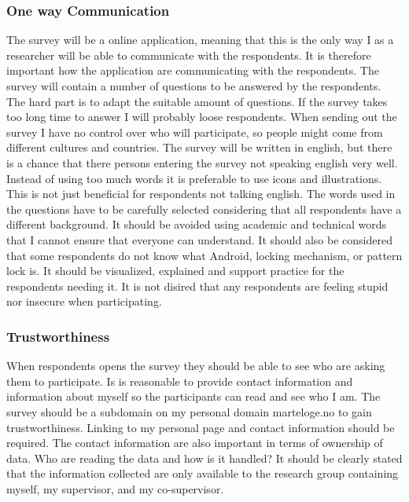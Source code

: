     \subsubsection*{One way Communication}
      The survey will be a online application, meaning that this is the only way I as a researcher will be able to communicate with the respondents. It is therefore important how the application are communicating with the respondents.
      The survey will contain a number of questions to be answered by the respondents. The hard part is to adapt the suitable amount of questions. If the survey takes too long time to answer I will probably loose respondents.
      When sending out the survey I have no control over who will participate, so people might come from different cultures and countries. The survey will be written in english, but there is a chance that there persons entering the survey not speaking english very well. Instead of using too much words it is preferable to use icons and illustrations. This is not just beneficial for respondents not talking english. 
      The words used in the questions have to be carefully selected considering that all respondents have a different background. It should be avoided using academic and technical words that I cannot ensure that everyone can understand. It should also be considered that some respondents do not know what Android, locking mechanism, or pattern lock is. It should be visualized, explained and support practice for the respondents needing it. It is not disired that any respondents are feeling stupid nor insecure when participating. 


    \subsubsection*{Trustworthiness}
      When respondents opens the survey they should be able to see who are asking them to participate. Is is reasonable to provide contact information and information about myself so the participants can read and see who I am. The survey should be a subdomain on my personal domain marteloge.no to gain trustworthiness. Linking to my personal page and contact information should be required.
      The contact information are also important in terms of ownership of data. Who are reading the data and how is it handled? It should be clearly stated that the information collected are only available to the research group containing myself, my supervisor, and my co-supervisor.

